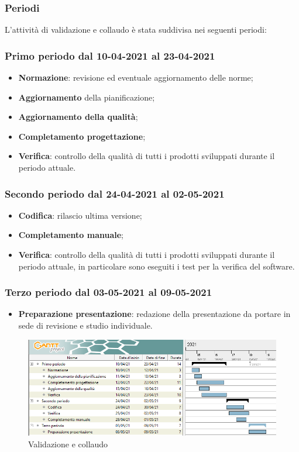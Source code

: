 \documentclass[]{article}
\begin{document}
	\subsubsection{Periodi}
	L’attività di validazione e collaudo è stata suddivisa nei seguenti periodi:
	\subsubsection{Primo periodo dal 10-04-2021 al 23-04-2021}
	\begin{itemize}
		\item \textbf{Normazione}: revisione ed eventuale aggiornamento delle norme;
		\item \textbf{Aggiornamento} della pianificazione;
		\item \textbf{Aggiornamento della qualità};
		\item \textbf{Completamento progettazione};
		\item \textbf{Verifica}: controllo della qualità di tutti i prodotti sviluppati durante il periodo attuale.
	\end{itemize}

	\subsubsection{Secondo periodo dal 24-04-2021 al 02-05-2021}
	\begin{itemize}
		\item \textbf{Codifica}: rilascio ultima versione;
		\item \textbf{Completamento manuale};
		\item \textbf{Verifica}: controllo della qualità di tutti i prodotti sviluppati durante il periodo attuale, in
		particolare sono eseguiti i test per la verifica del software.
	\end{itemize}

	\subsubsection{Terzo periodo dal 03-05-2021 al 09-05-2021}
	\begin{itemize}
		\item \textbf{Preparazione presentazione}: redazione della presentazione da portare in sede di revisione e
		studio individuale.
	\end{itemize}

	\newpage
	\begin{figure}[h!]
	\includegraphics[width=1.7\textwidth, left]{images/5_Validazione_e_collaudo.png}
	\caption{Validazione e collaudo}
	\end{figure}
	
\end{document}
